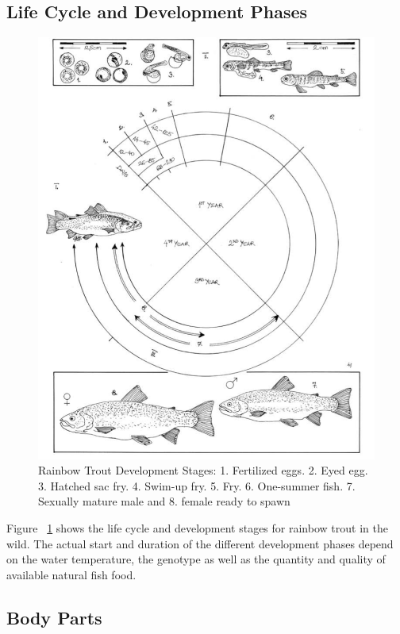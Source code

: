 \subsection{Life Cycle and Development Phases}

\begin{figure}[H]
  \centering
   \includegraphics[scale = 0.6]{images/LifeCycle.png}
  \caption{Rainbow Trout Development Stages: 
  1. Fertilized eggs. 2. Eyed egg. 3. Hatched sac fry. 4. Swim-up fry. 5. Fry. 
6. One-summer fish. 7. Sexually mature male and 8. female ready to spawn}
   \label{fig:LifeCycle}
\end{figure}

Figure ~\ref{fig:LifeCycle} shows the life cycle and development stages for rainbow trout in the wild.
The actual start and duration of the different development phases depend on the water temperature, 
the genotype as well as the quantity and quality of available natural fish food.

\subsection{Body Parts}

